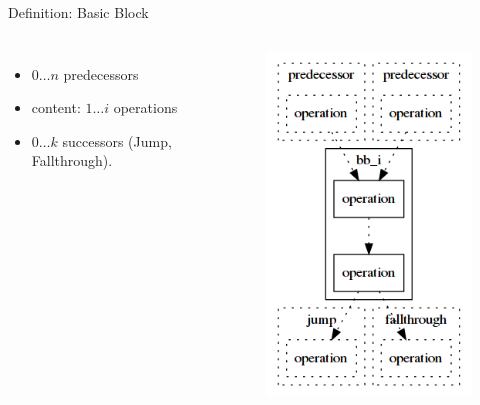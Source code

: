 \documentclass[11pt]{beamer}
\begin{document}
\begin{frame}{Definition: Basic Block}
\begin{columns}
    \begin{itemize}
        \item $0 \ldots n$ predecessors
        \item content: $1 \ldots i$ operations
        \item $0 \ldots k$ successors (Jump, Fallthrough).
    \end{itemize}
\begin{figure}
    \centering
    \includegraphics[scale=0.4]{figures/bb_def.png}
\end{figure}
\end{columns}
\end{frame}
\end{document}
